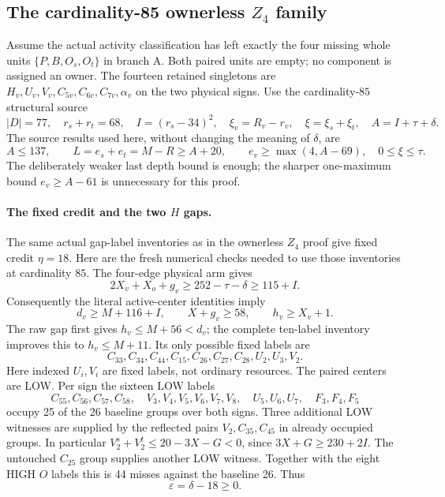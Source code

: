 \documentclass[10pt,a4paper]{article}
\theoremstyle{definition}
\begin{document}
\clearpage
\subsection{The cardinality-85 ownerless $Z_4$ family}

Assume the actual activity classification has left exactly the four
missing whole units $\{P,B,O_s,O_t\}$ in branch A. Both paired units
are empty; no component is assigned an owner. The fourteen retained
singletons are $H_v,U_v,V_v,C_{5v},C_{6v},C_{7v},\alpha_v$ on the two
physical signs. Use the cardinality-$85$ structural source
\[
 |D|=77,\quad r_s+r_t=68,\quad
 I=(r_s-34)^2,\quad \xi_v=R_v-r_v,\quad \xi=\xi_s+\xi_t,
 \quad A=I+\tau+\delta.
\]
The source results used here, without changing the meaning of $\delta$,
are
\begin{equation}\label{eq:85-ownerless-source}
 A\le137,\qquad L=e_s+e_t=M-R\ge A+20,
 \qquad e_v\ge\max(4,A-69),\quad 0\le\xi\le\tau.
\end{equation}
The deliberately weaker last depth bound is enough; the sharper
one-maximum bound $e_v\ge A-61$ is unnecessary for this proof.

\paragraph{The fixed credit and the two $H$ gaps.}
The same actual gap-label inventories as in the ownerless $Z_4$ proof
give fixed credit $\eta=18$. Here are the fresh numerical checks needed
to use those inventories at cardinality $85$. The four-edge physical
arm gives
\[
 2X_v+X_o+g_v\ge252-\tau-\delta\ge115+I.
\]
Consequently the literal active-center identities imply
\[
 d_v\ge M+116+I,\qquad X+g_v\ge58,\qquad h_v\ge X_v+1.
\]
The raw gap first gives $h_v\le M+56<d_v$; the complete ten-label
inventory improves this to $h_v\le M+11$. Its only possible fixed
labels are
\[
 C_{33},C_{34},C_{44},C_{15},C_{26},C_{27},C_{28},U_2,U_3,V_2.
\]
Here indexed $U_i,V_i$ are fixed labels, not ordinary resources.
The paired centers are LOW. Per sign the sixteen LOW labels
\[
 C_{55},C_{56},C_{57},C_{58},\quad V_3,V_4,V_5,V_6,V_7,V_8,
 \quad U_5,U_6,U_7,\quad F_3,F_4,F_5
\]
occupy 25 of the 26 baseline groups over both signs. Three additional
LOW witnesses are supplied by the reflected pairs $V_2,C_{35},C_{45}$
in already occupied groups. In particular
$V_2^s+V_2^t\le20-3X-G<0$, since
$3X+G\ge230+2I$. The untouched $C_{25}$ group supplies another
LOW witness. Together with the eight HIGH $O$ labels this is 44
misses against the baseline 26. Thus
\[
 \varepsilon=\delta-18\ge0.
\]
\end{document}
